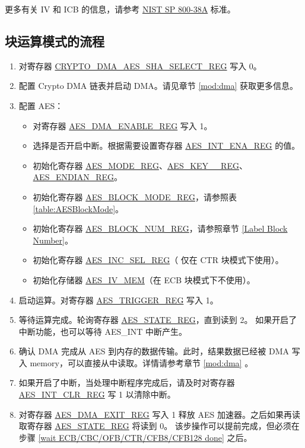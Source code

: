 \documentclass[main\_\_CN.tex]{subfiles}
\begin{document}
更多有关 IV 和 ICB 的信息，请参考 \href{https://nvlpubs.nist.gov/nistpubs/Legacy/SP/nistspecialpublication800-38a.pdf}{NIST SP 800-38A} 标准。

\subsection{ 块运算模式的流程 }

\begin{enumerate}
    \item 对寄存器 \hyperref[regdesc:CRYPTODMAAESSHASELECTREG]{CRYPTO\_DMA\_AES\_SHA\_SELECT\_REG} 写入 0。
    \item 配置 Crypto DMA 链表并启动 DMA。请见章节 \ref{mod:dma} \textit{}获取更多信息。
    \item 配置 AES：
    \begin{itemize}
        \item 对寄存器 \hyperref[regdesc:AESDMAENABLEREG]{AES\_DMA\_ENABLE\_REG} 写入 1。
        \item 选择是否开启中断。根据需要设置寄存器 \hyperref[regdesc:AESINTENAREG]{AES\_INT\_ENA\_REG} 的值。
        \item 初始化寄存器 \hyperref[regdesc:AESMODEREG]{AES\_MODE\_REG}、\hyperref[regdesc:AESKEYnREG]{AES\_KEY\_\_REG}、\hyperref[regdesc:AESENDIANREG]{AES\_ENDIAN\_REG}。
        \item 初始化寄存器 \hyperref[regdesc:AESBLOCKMODEREG]{AES\_BLOCK\_MODE\_REG}，请参照表 \ref{table:AESBlockMode}。
        \item 初始化寄存器 \hyperref[regdesc:AESBLOCKNUMREG]{AES\_BLOCK\_NUM\_REG}，请参照章节 \ref{Label Block Number}。
        \item 初始化寄存器 \hyperref[regdesc:AESINCSELREG]{AES\_INC\_SEL\_REG}（                仅在 CTR 块模式下使用）。
        \item 初始化存储器 \hyperref[memdesc:AESIVMEM]{AES\_IV\_MEM}（在 ECB 块模式下不使用）。
    \end{itemize}
    \item 启动运算。对寄存器 \hyperref[regdesc:AESTRIGGERREG]{AES\_TRIGGER\_REG} 写入 1。
    \item \label{wait ECB/CBC/OFB/CTR/CFB8/CFB128 done}
            等待运算完成。轮询寄存器 \hyperref[regdesc:AESSTATEREG]{AES\_STATE\_REG}，直到读到 2。
            如果开启了中断功能，也可以等待 AES\_INT 中断产生。
    \item 确认 DMA 完成从 AES 到内存的数据传输。此时，结果数据已经被 DMA 写入 memory，可以直接从中读取。详情请参考章节 \ref{mod:dma} \textit{}。
    \item 如果开启了中断，当处理中断程序完成后，请及时对寄存器 \hyperref[regdesc:AESINTCLRREG]{AES\_INT\_CLR\_REG} 写 1 以清除中断。
    \item 对寄存器 \hyperref[regdesc:AESDMAEXITREG]{AES\_DMA\_EXIT\_REG} 写入 1 释放 AES 加速器。之后如果再读取寄存器 \hyperref[regdesc:AESSTATEREG]{AES\_STATE\_REG} 将读到 0。
    该步操作可以提前完成，但必须在步骤 \ref{wait ECB/CBC/OFB/CTR/CFB8/CFB128 done} 之后。
\end{enumerate}
\end{document}
